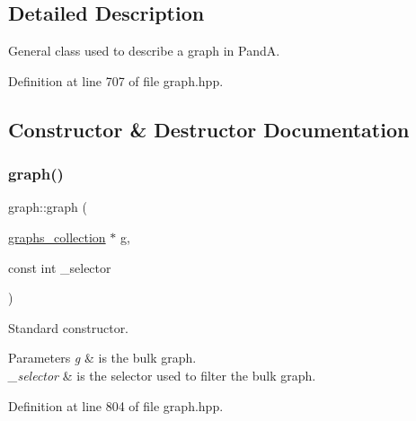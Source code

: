 \subsection{Detailed Description}
General class used to describe a graph in PandA. 

Definition at line 707 of file graph.\+hpp.



\subsection{Constructor \& Destructor Documentation}
\mbox{\label{structgraph_a3a867374679e408a73742d38282cef0b}} 
\subsubsection{\texorpdfstring{graph()}{graph()}\hspace{0.1cm}{\footnotesize\ttfamily [1/2]}}
{\footnotesize\ttfamily graph\+::graph (\begin{DoxyParamCaption}\item[{\hyperlink{structgraphs__collection}{graphs\+\_\+collection} $\ast$}]{g,  }\item[{const int}]{\+\_\+selector }\end{DoxyParamCaption})\hspace{0.3cm}{\ttfamily [inline]}}



Standard constructor. 


\begin{DoxyParams}{Parameters}
{\em g} & is the bulk graph. \\
\hline
{\em \+\_\+selector} & is the selector used to filter the bulk graph. \\
\hline
\end{DoxyParams}


Definition at line 804 of file graph.\+hpp.

\mbox{\label{structgraph_ae1d03c89ac36e0008933e1e37459417b}} 
